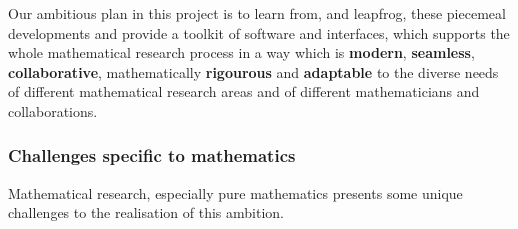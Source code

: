 Our ambitious plan in this project is to learn from, and leapfrog,
these piecemeal developments and provide a toolkit of software and
interfaces, which supports the whole mathematical research process in
a way which is \textbf{modern}, \textbf{seamless},
\textbf{collaborative}, mathematically \textbf{rigourous} and
\textbf{adaptable} to the diverse needs of different mathematical
research areas and of different mathematicians and collaborations.



\subsubsection{Challenges specific to  mathematics}

Mathematical research, especially pure mathematics presents some
unique challenges to the realisation of this ambition. 


